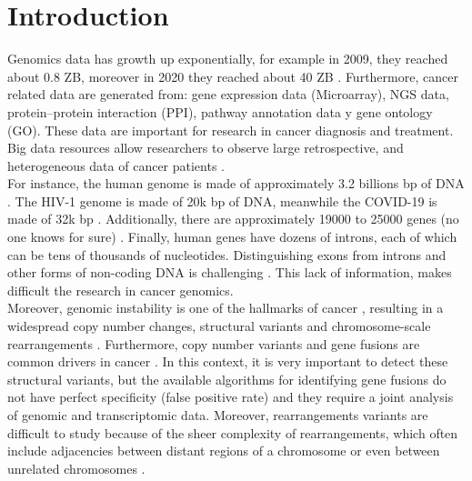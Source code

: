 \documentclass{svproc}
\begin{document}
\section{Introduction} 

Genomics data has growth up exponentially, for example in 2009, they reached about 0.8 ZB, moreover in 2020 they reached about 40 ZB \cite{prabahar2016perspectives}. Furthermore, cancer related data are generated from: gene expression data (Microarray), NGS data, protein–protein interaction (PPI), pathway annotation data y gene ontology (GO). These data are important for research in cancer diagnosis and treatment. Big data resources allow researchers to observe large retrospective, and heterogeneous data of cancer patients \cite{berman2013principles}.\\

For instance, the human genome is made of approximately 3.2 billions bp of DNA \cite{archibald2018genomics}. The HIV-1 genome is made of 20k bp of DNA, meanwhile the COVID-19 is made of 32k bp \cite{randhawa2020machine}. Additionally, there are approximately 19000 to 25000 genes (no one knows for sure) \cite{archibald2018genomics}. Finally, human genes have dozens of introns, each of which can be tens of thousands of nucleotides. Distinguishing exons from introns and other forms of non-coding DNA is challenging \cite{archibald2018genomics}. This lack of information, makes difficult the research in cancer genomics.\\

Moreover, genomic instability is one of the hallmarks of cancer \cite{hanahan2011hallmarks,hastings2009mechanisms},	resulting in a widespread copy number changes, structural variants and chromosome-scale rearrangements \cite{nattestad2016splitthreader}. Furthermore, copy number variants and gene fusions are common drivers in cancer \cite{shlien2009copy, mitelman2007impact}. In this context, it is very important to detect these structural variants, but the available algorithms for identifying gene fusions do not have perfect specificity (false positive rate)  and they require a joint analysis of genomic and transcriptomic data. Moreover, rearrangements variants are difficult to study because of the sheer complexity of rearrangements, which often include adjacencies between distant regions of a chromosome or even between unrelated chromosomes \cite{nattestad2016splitthreader}.  \\
\end{document}

